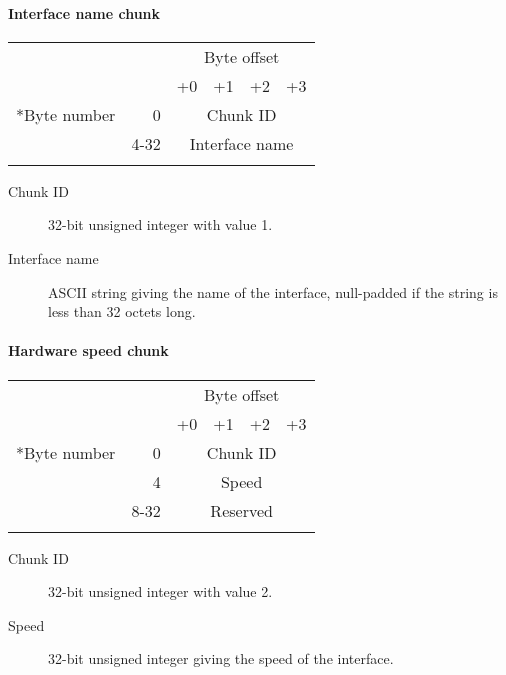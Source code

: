 \documentclass[a4paper,12pt]{report}
\begin{document}
\paragraph{Interface name chunk}
\begin{center}
\begin{tabular}{r r | m{1in} | m{1in} | m{1in} | m{1in} |}
 & & \multicolumn{4}{c}{Byte offset} \\
 & & +0 & +1 & +2 & +3 \\
\hhline{~-----}
\multirow{2}*{Byte number} & 0 & \multicolumn{4}{c|}{Chunk ID} \\
\hhline{~~----}
 & 4-32 & \multicolumn{4}{c|}{Interface name} \\
\hhline{~~----}
\end{tabular}
\end{center}
\begin{description}
\item[Chunk ID]  32-bit unsigned integer with value 1.
\item[Interface name]  ASCII string giving the name of the interface, null-padded if the string is less than 32 octets long.
\end{description}

\paragraph{Hardware speed chunk}
\begin{center}
\begin{tabular}{r r | m{1in} | m{1in} | m{1in} | m{1in} |}
 & & \multicolumn{4}{c}{Byte offset} \\
 & & +0 & +1 & +2 & +3 \\
\hhline{~-----}
\multirow{3}*{Byte number} & 0 & \multicolumn{4}{c|}{Chunk ID} \\
\hhline{~~----}
 & 4 & \multicolumn{4}{c|}{Speed} \\
\hhline{~~----}
 & 8-32 & \multicolumn{4}{c|}{Reserved} \\
\hhline{~~----}
\end{tabular}
\end{center}
\begin{description}
\item[Chunk ID]  32-bit unsigned integer with value 2.
\item[Speed]  32-bit unsigned integer giving the speed of the interface.
\end{description}
\end{document}
